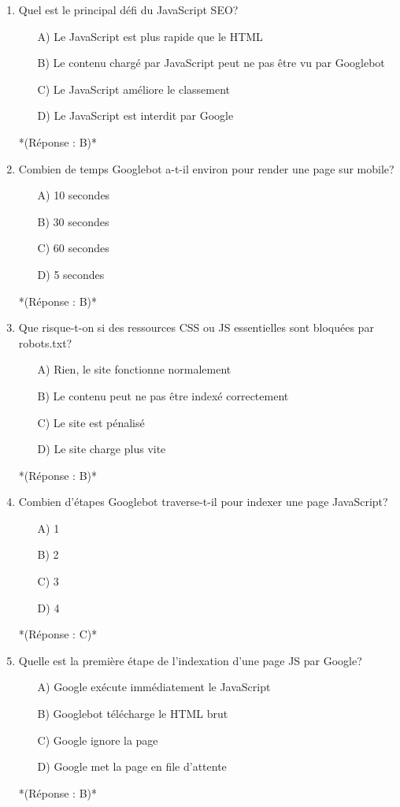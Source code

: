 \documentclass[12pt,a4paper,twoside]{report}
\begin{document}
\begin{enumerate}
\item Quel est le principal défi du JavaScript SEO?
\begin{itemize}
\item[A)] Le JavaScript est plus rapide que le HTML
\item[B)] Le contenu chargé par JavaScript peut ne pas être vu par Googlebot
\item[C)] Le JavaScript améliore le classement
\item[D)] Le JavaScript est interdit par Google
\end{itemize}
*(Réponse : B)*

\item Combien de temps Googlebot a-t-il environ pour render une page sur mobile?
\begin{itemize}
\item[A)] 10 secondes
\item[B)] 30 secondes
\item[C)] 60 secondes
\item[D)] 5 secondes
\end{itemize}
*(Réponse : B)*

\item Que risque-t-on si des ressources CSS ou JS essentielles sont bloquées par robots.txt?
\begin{itemize}
\item[A)] Rien, le site fonctionne normalement
\item[B)] Le contenu peut ne pas être indexé correctement
\item[C)] Le site est pénalisé
\item[D)] Le site charge plus vite
\end{itemize}
*(Réponse : B)*

\item Combien d'étapes Googlebot traverse-t-il pour indexer une page JavaScript?
\begin{itemize}
\item[A)] 1
\item[B)] 2
\item[C)] 3
\item[D)] 4
\end{itemize}
*(Réponse : C)*

\item Quelle est la première étape de l'indexation d'une page JS par Google?
\begin{itemize}
\item[A)] Google exécute immédiatement le JavaScript
\item[B)] Googlebot télécharge le HTML brut
\item[C)] Google ignore la page
\item[D)] Google met la page en file d'attente
\end{itemize}
*(Réponse : B)*


\end{enumerate}
\end{document}
